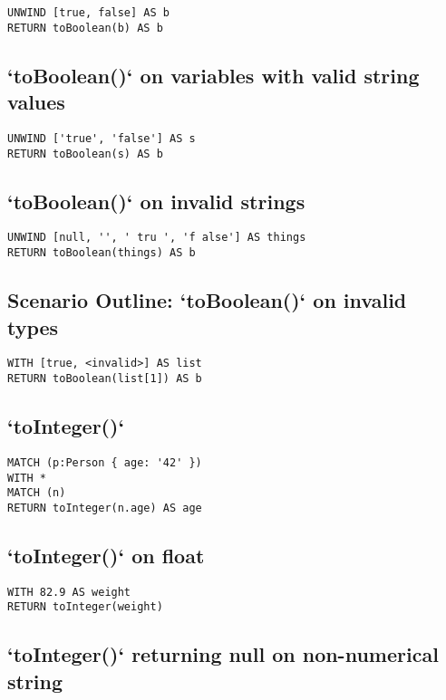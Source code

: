 \begin{lstlisting}
UNWIND [true, false] AS b
RETURN toBoolean(b) AS b
\end{lstlisting}

\subsection{`toBoolean()` on variables with valid string values}

\begin{lstlisting}
UNWIND ['true', 'false'] AS s
RETURN toBoolean(s) AS b
\end{lstlisting}

\subsection{`toBoolean()` on invalid strings}

\begin{lstlisting}
UNWIND [null, '', ' tru ', 'f alse'] AS things
RETURN toBoolean(things) AS b
\end{lstlisting}

\subsection{Scenario Outline: `toBoolean()` on invalid types}

\begin{lstlisting}
WITH [true, <invalid>] AS list
RETURN toBoolean(list[1]) AS b
\end{lstlisting}

\subsection{`toInteger()`}

\begin{lstlisting}
MATCH (p:Person { age: '42' })
WITH *
MATCH (n)
RETURN toInteger(n.age) AS age
\end{lstlisting}

\subsection{`toInteger()` on float}

\begin{lstlisting}
WITH 82.9 AS weight
RETURN toInteger(weight)
\end{lstlisting}

\subsection{`toInteger()` returning null on non-numerical string}

